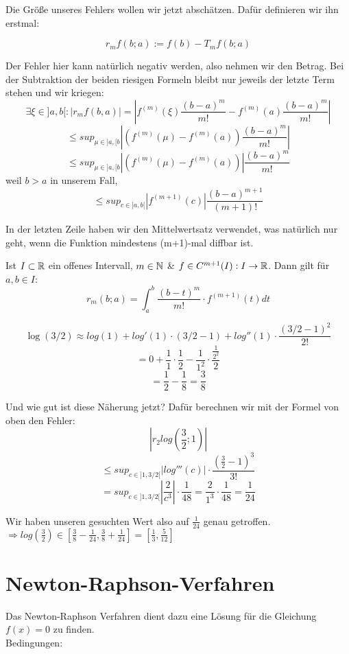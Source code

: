 \begin{concept}
Die Größe unseres Fehlers wollen wir jetzt abschätzen.
Dafür definieren wir ihn erstmal:

$$r_mf(b;a) := f(b)-T_mf(b;a)$$

Der Fehler hier kann natürlich negativ werden, also nehmen wir den Betrag. Bei der Subtraktion der beiden riesigen Formeln bleibt nur jeweils der letzte Term stehen und wir kriegen:
$$\exists \xi \in ]a,b[: |r_mf(b,a)| = |f^{(m)}(\xi)\frac{(b-a)^m}{m!}-f^{(m)}(a)\frac{(b-a)^m}{m!}|$$
$$\leq sup_{\mu \in ]a,[b}|(f^{(m)}(\mu)-f^{(m)}(a))\frac{(b-a)^m}{m!}|$$
$$\leq sup_{\mu \in ]a,[b}|(f^{(m)}(\mu)-f^{(m)}(a))|\frac{(b-a)^m}{m!}$$
weil $b>a$ in unserem Fall,
$$\leq sup_{c \in ]a,b[}|f^{(m+1)}(c)|\frac{(b-a)^{m+1}}{(m+1)!}$$

In der letzten Zeile haben wir den Mittelwertsatz verwendet, was natürlich nur geht, wenn die Funktion mindestens (m+1)-mal diffbar ist.
\end{concept}

\begin{theorem}
Ist $I \subset \mathbb{R}$ ein offenes Intervall, $m\in \mathbb{N}$ \& $f\in C^{m+1}(I): I \to \mathbb{R}$.
Dann gilt für $a, b \in I$:
$$r_m(b;a) = \int_a^b\frac{(b-t)^m}{m!} \cdot f^{(m+1)}(t) dt$$
\end{theorem}

\begin{example}[log(3/2) at 1]

$$\log(3/2) \approx log(1) + log'(1)\cdot(3/2 - 1) + log''(1)\cdot\frac{(3/2-1)^2}{2!}$$
$$= 0 + \frac{1}{1}\cdot\frac{1}{2} - \frac{1}{1^2}\cdot\frac{\frac{1}{2^2}}{2}$$
$$= \frac{1}{2} - \frac{1}{8} = \frac{3}{8}$$

Und wie gut ist diese Näherung jetzt? Dafür berechnen wir mit der Formel von oben den Fehler:
$$|r_2log(\frac{3}{2};1)|$$
$$\leq sup_{c \in ]1,3/2[}|log'''(c)|\cdot\frac{(\frac{3}{2}-1)^{3}}{3!}$$
$$= sup_{c \in ]1,3/2[}|\frac{2}{c^3}|\cdot \frac{1}{48} = \frac{2}{1^3}\cdot\frac{1}{48} = \frac{1}{24}$$

Wir haben unseren gesuchten Wert also auf $\frac{1}{24}$ genau getroffen.
$\Rightarrow log(\frac{3}{2})\in [\frac{3}{8}-\frac{1}{24}, \frac{3}{8}+\frac{1}{24}] = [\frac{1}{3}, \frac{5}{12}]$
\end{example}

\section{Newton-Raphson-Verfahren}
Das Newton-Raphson Verfahren dient dazu eine Lösung für die Gleichung $f(x) = 0$ zu finden.\\
Bedingungen:

